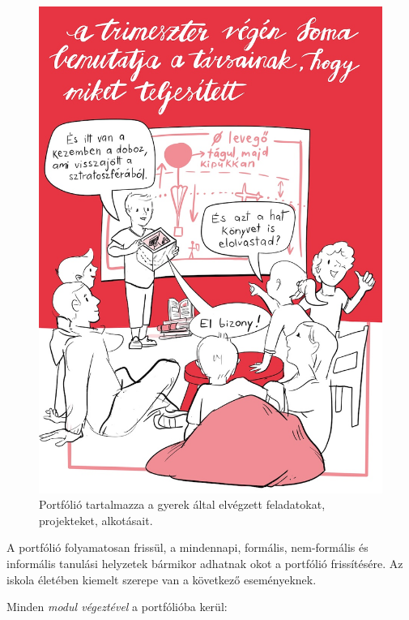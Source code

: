 \begin{figure}
\centering
\includegraphics{pics/4a_portfolio_soma.jpg}
\caption{Portfólió  tartalmazza a gyerek által elvégzett feladatokat,
projekteket, alkotásait.}
\end{figure}

A portfólió folyamatosan frissül, a mindennapi, formális, nem-for\-má\-lis
és informális tanulási helyzetek bármikor adhatnak okot a portfólió
frissítésére. Az iskola életében kiemelt szerepe van a következő
eseményeknek.

Minden \emph{modul végeztével} a portfólióba kerül:

